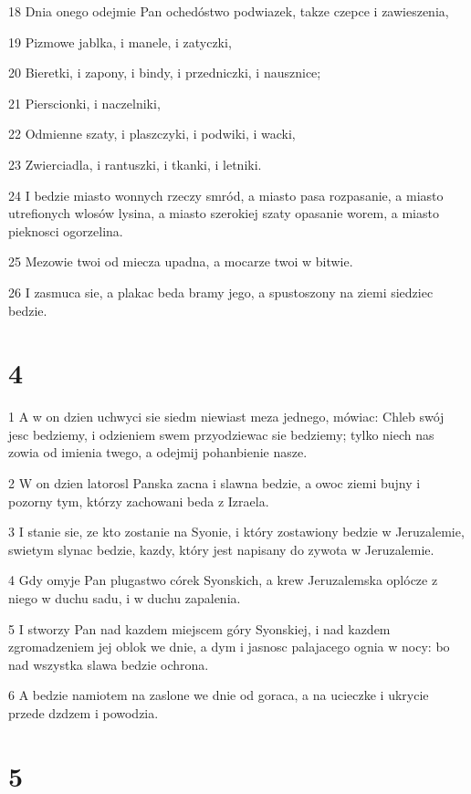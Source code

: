 \par 18 Dnia onego odejmie Pan ochedóstwo podwiazek, takze czepce i zawieszenia,
\par 19 Pizmowe jablka, i manele, i zatyczki,
\par 20 Bieretki, i zapony, i bindy, i przedniczki, i nausznice;
\par 21 Pierscionki, i naczelniki,
\par 22 Odmienne szaty, i plaszczyki, i podwiki, i wacki,
\par 23 Zwierciadla, i rantuszki, i tkanki, i letniki.
\par 24 I bedzie miasto wonnych rzeczy smród, a miasto pasa rozpasanie, a miasto utrefionych wlosów lysina, a miasto szerokiej szaty opasanie worem, a miasto pieknosci ogorzelina.
\par 25 Mezowie twoi od miecza upadna, a mocarze twoi w bitwie.
\par 26 I zasmuca sie, a plakac beda bramy jego, a spustoszony na ziemi siedziec bedzie.

\chapter{4}

\par 1 A w on dzien uchwyci sie siedm niewiast meza jednego, mówiac: Chleb swój jesc bedziemy, i odzieniem swem przyodziewac sie bedziemy; tylko niech nas zowia od imienia twego, a odejmij pohanbienie nasze.
\par 2 W on dzien latorosl Panska zacna i slawna bedzie, a owoc ziemi bujny i pozorny tym, którzy zachowani beda z Izraela.
\par 3 I stanie sie, ze kto zostanie na Syonie, i który zostawiony bedzie w Jeruzalemie, swietym slynac bedzie, kazdy, który jest napisany do zywota w Jeruzalemie.
\par 4 Gdy omyje Pan plugastwo córek Syonskich, a krew Jeruzalemska oplócze z niego w duchu sadu, i w duchu zapalenia.
\par 5 I stworzy Pan nad kazdem miejscem góry Syonskiej, i nad kazdem zgromadzeniem jej oblok we dnie, a dym i jasnosc palajacego ognia w nocy: bo nad wszystka slawa bedzie ochrona.
\par 6 A bedzie namiotem na zaslone we dnie od goraca, a na ucieczke i ukrycie przede dzdzem i powodzia.

\chapter{5}

